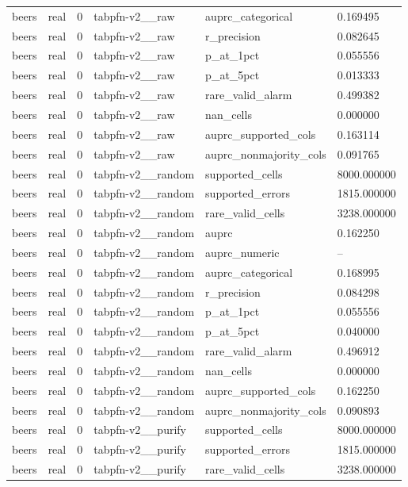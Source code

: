 \begin{tabular}{llllll}
beers & real & 0 & tabpfn-v2\_\_raw & auprc\_categorical & 0.169495 \\
beers & real & 0 & tabpfn-v2\_\_raw & r\_precision & 0.082645 \\
beers & real & 0 & tabpfn-v2\_\_raw & p\_at\_1pct & 0.055556 \\
beers & real & 0 & tabpfn-v2\_\_raw & p\_at\_5pct & 0.013333 \\
beers & real & 0 & tabpfn-v2\_\_raw & rare\_valid\_alarm & 0.499382 \\
beers & real & 0 & tabpfn-v2\_\_raw & nan\_cells & 0.000000 \\
beers & real & 0 & tabpfn-v2\_\_raw & auprc\_supported\_cols & 0.163114 \\
beers & real & 0 & tabpfn-v2\_\_raw & auprc\_nonmajority\_cols & 0.091765 \\
beers & real & 0 & tabpfn-v2\_\_random & supported\_cells & 8000.000000 \\
beers & real & 0 & tabpfn-v2\_\_random & supported\_errors & 1815.000000 \\
beers & real & 0 & tabpfn-v2\_\_random & rare\_valid\_cells & 3238.000000 \\
beers & real & 0 & tabpfn-v2\_\_random & auprc & 0.162250 \\
beers & real & 0 & tabpfn-v2\_\_random & auprc\_numeric & -- \\
beers & real & 0 & tabpfn-v2\_\_random & auprc\_categorical & 0.168995 \\
beers & real & 0 & tabpfn-v2\_\_random & r\_precision & 0.084298 \\
beers & real & 0 & tabpfn-v2\_\_random & p\_at\_1pct & 0.055556 \\
beers & real & 0 & tabpfn-v2\_\_random & p\_at\_5pct & 0.040000 \\
beers & real & 0 & tabpfn-v2\_\_random & rare\_valid\_alarm & 0.496912 \\
beers & real & 0 & tabpfn-v2\_\_random & nan\_cells & 0.000000 \\
beers & real & 0 & tabpfn-v2\_\_random & auprc\_supported\_cols & 0.162250 \\
beers & real & 0 & tabpfn-v2\_\_random & auprc\_nonmajority\_cols & 0.090893 \\
beers & real & 0 & tabpfn-v2\_\_purify & supported\_cells & 8000.000000 \\
beers & real & 0 & tabpfn-v2\_\_purify & supported\_errors & 1815.000000 \\
beers & real & 0 & tabpfn-v2\_\_purify & rare\_valid\_cells & 3238.000000 \\

\end{tabular}
